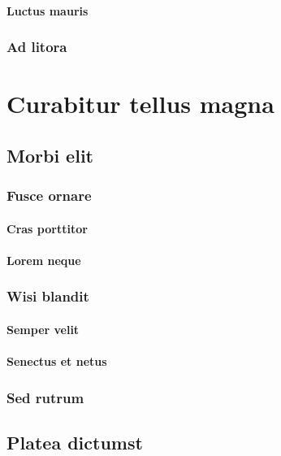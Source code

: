 \subsubsection{Luctus mauris} \lipsum[20]
\subsection{Ad litora} \lipsum [21-22]



\chapter{Curabitur tellus magna}

 \lipsum[1-2]

\section{Morbi elit} \lipsum[3-4]
\subsection{Fusce ornare} \lipsum[5]
\subsubsection{Cras porttitor} \lipsum[6]
\subsubsection{Lorem neque} \lipsum[7]
\subsection{Wisi blandit} \lipsum[8]
\subsubsection{Semper velit} \lipsum[9]
\subsubsection{Senectus et netus} \lipsum[10]
\subsection{Sed rutrum} \lipsum[11-12]

\section{Platea dictumst} \lipsum[13-14]
